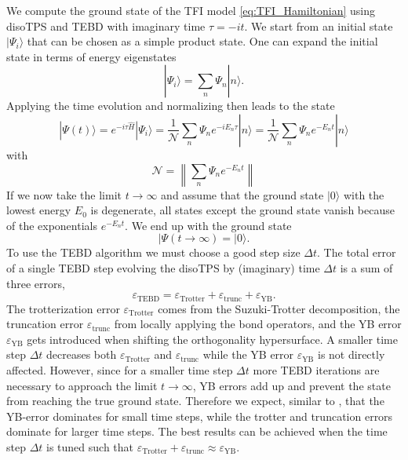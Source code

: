 We compute the ground state of the TFI model \eqref{eq:TFI_Hamiltonian} using disoTPS and TEBD with imaginary time $\tau = -i t$. We start from an initial state $|\Psi_i\rangle$ that can be chosen as a simple product state. One can expand the initial state in terms of energy eigenstates
\begin{equation}
	|\Psi_i\rangle = \sum_{n} \Psi_n |n\rangle.
\end{equation}
Applying the time evolution and normalizing then leads to the state
\begin{equation}
	|\Psi(t)\rangle = e^{-i\tau\hat{H}} |\Psi_i\rangle = \frac{1}{\mathcal{N}} \sum_{n} \Psi_n e^{-iE_n\tau} |n\rangle = \frac{1}{\mathcal{N}} \sum_{n} \Psi_n e^{-E_nt} |n\rangle
\end{equation}
with
\begin{equation}
	\mathcal{N} = \left\lVert\sum_{n} \Psi_n e^{-E_nt}\right\rVert
\end{equation}
If we now take the limit $t \rightarrow \infty$ and assume that the ground state $|0\rangle$ with the lowest energy $E_0$ is degenerate, all states except the ground state vanish because of the exponentials $e^{-E_nt}$. We end up with the ground state
\begin{equation}
	|\Psi(t\rightarrow\infty) = |0\rangle.
\end{equation}
To use the TEBD algorithm we must choose a good step size $\Delta t$. The total error of a single TEBD step evolving the disoTPS by (imaginary) time $\Delta t$ is a sum of three errors,
\begin{equation}
	\varepsilon_\text{TEBD} = \varepsilon_\text{Trotter} + \varepsilon_\text{trunc} + \varepsilon_{\text{YB}}.
\end{equation} 
The trotterization error $\varepsilon_\text{Trotter}$ comes from the Suzuki-Trotter decomposition, the truncation error $\varepsilon_\text{trunc}$ from locally applying the bond operators, and the YB error $\varepsilon_{\text{YB}}$ gets introduced when shifting the orthogonality hypersurface. A smaller time step $\Delta t$ decreases both $\varepsilon_\text{Trotter}$ and $\varepsilon_\text{trunc}$ while the YB error $\varepsilon_{\text{YB}}$ is not directly affected. However, since for a smaller time step $\Delta t$ more TEBD iterations are necessary to approach the limit $t\rightarrow\infty$, YB errors add up and prevent the state from reaching the true ground state. Therefore we expect, similar to \cite{cite:isometric_tensor_network_states_in_two_dimensions, cite:efficient_simulation_of_dynamics_in_two_dimensional_quantum_spin_systems}, that the YB-error dominates for small time steps, while the trotter and truncation errors dominate for larger time steps. The best results can be achieved when the time step $\Delta t$ is tuned such that $\varepsilon_\text{Trotter} + \varepsilon_\text{trunc} \approx \varepsilon_{\text{YB}}$. \par
